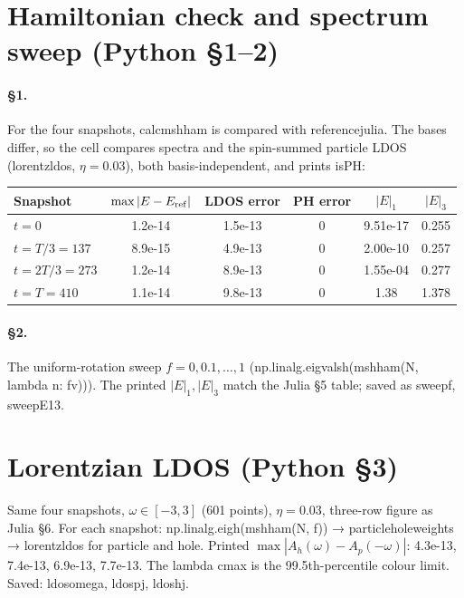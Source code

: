 \documentclass[11pt]{article}
\newcommand{\codeus}{\textunderscore\allowbreak}
\renewcommand{\code}[1]{{\ttfamily\let\_\codeus #1}}
\begin{document}
\section{Hamiltonian check and spectrum sweep (Python §1–2)}

\paragraph{§1.} For the four snapshots, \code{calc\_msh\_ham} is compared with \code{reference\_julia}. The bases differ, so the cell compares spectra and the spin-summed particle LDOS (\code{lorentz\_ldos}, $\eta=0.03$), both basis-independent, and prints \code{isPH}:

\begin{table}[H]
\centering\small
\begin{tabular}{lccccc}
\toprule
Snapshot & $\max|E-E_{\rm ref}|$ & LDOS error & PH error & $|E|_1$ & $|E|_3$\\
\midrule
$t=0$ & 1.2e-14 & 1.5e-13 & 0 & 9.51e-17 & 0.255\\
$t=T/3=137$ & 8.9e-15 & 4.9e-13 & 0 & 2.00e-10 & 0.257\\
$t=2T/3=273$ & 1.2e-14 & 8.9e-13 & 0 & 1.55e-04 & 0.277\\
$t=T=410$ & 1.1e-14 & 9.8e-13 & 0 & 1.38 & 1.378\\
\bottomrule
\end{tabular}
\end{table}

\paragraph{§2.} The uniform-rotation sweep $f=0,0.1,\dots,1$ (\code{np.linalg.eigvalsh(msh\_ham(N, lambda n: fv))}). The printed $|E|_1,|E|_3$ match the Julia §5 table; saved as \code{sweep\_f}, \code{sweep\_E13}.

\section{Lorentzian LDOS (Python §3)}

Same four snapshots, $\omega\in[-3,3]$ (601 points), $\eta=0.03$, three-row figure as Julia §6. For each snapshot: \code{np.linalg.eigh(msh\_ham(N, f))} → \code{particle\_hole\_weights} → \code{lorentz\_ldos} for particle and hole. Printed $\max|A_h(\omega)-A_p(-\omega)|$: 4.3e-13, 7.4e-13, 6.9e-13, 7.7e-13. The lambda \code{cmax} is the 99.5th-percentile colour limit. Saved: \code{ldos\_omega}, \code{ldos\_p\_j}, \code{ldos\_h\_j}.
\end{document}
